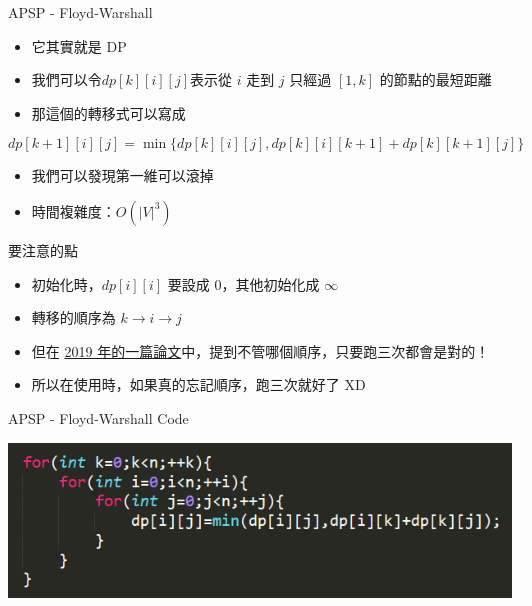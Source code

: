 \documentclass[aspectratio=169]{beamer}
\begin{document}
    \begin{frame}{APSP - Floyd-Warshall}
        \begin{itemize}
            \item 它其實就是 DP
            \item 我們可以令$dp[k][i][j]$表示從 $i$ 走到 $j$ 只經過 $[1,k]$ 的節點的最短距離
            \item 那這個的轉移式可以寫成\\ 
        \end{itemize}
        \vspace{3mm}
        $$dp[k+1][i][j]=\min\{dp[k][i][j],dp[k][i][k+1]+dp[k][k+1][j]\}$$
        \begin{itemize}
            \item<2-> 我們可以發現第一維可以滾掉
            \item<3-> 時間複雜度：$O(|V|^3)$
        \end{itemize}
    \end{frame}
    
    \begin{frame}{要注意的點}
        \begin{itemize}
            \item 初始化時，$dp[i][i]$ 要設成 $0$，其他初始化成 $\infty$
            \item 轉移的順序為 $k \rightarrow i \rightarrow j$
            \item 但在 \href{https://arxiv.org/pdf/1904.01210.pdf}{2019 年的一篇論文}中，提到不管哪個順序，只要跑三次都會是對的！
            \item 所以在使用時，如果真的忘記順序，跑三次就好了 XD
        \end{itemize}
    \end{frame}
    \begin{frame}{APSP - Floyd-Warshall Code}
        \begin{center}
            \includegraphics[scale=0.7]{code/FloydWarshall_code.png}
        \end{center}
    \end{frame}
    
\end{document}
